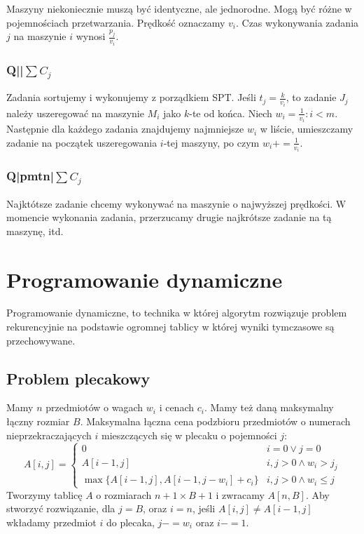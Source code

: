 \documentclass{../notatki}
\begin{document}
Maszyny niekoniecznie muszą być identyczne, ale jednorodne. Mogą być
różne w pojemnościach
przetwarzania. Prędkość oznaczamy $v_i$. Czas wykonywania zadania $j$
na maszynie $i$ wynosi $\frac{p_j}{v_i}$.

\subsubsection{Q||\texorpdfstring{$\sum C_j$}{sum Cj}}

Zadania sortujemy i wykonujemy z porządkiem SPT. Jeśli $t_j = \frac{k}{v_i}$, to
zadanie $J_j$ należy uszeregować na maszynie $M_i$ jako $k$-te od końca.
Niech $w_i = \frac{1}{v_i}: i < m$. Następnie dla każdego zadania
znajdujemy najmniejsze $w_i$ w liście, umieszczamy zadanie na
początek uszeregowania
$i$-tej maszyny, po czym $w_i += \frac{1}{v_i}$.

\subsubsection{Q|pmtn|\texorpdfstring{$\sum C_j$}{sum Cj}}

Najktótsze zadanie chcemy wykonywać na maszynie o najwyższej
prędkości. W momencie
wykonania zadania, przerzucamy drugie najkrótsze zadanie na tą maszynę, itd.

\section{Programowanie dynamiczne}

Programowanie dynamiczne, to technika w której algorytm rozwiązuje problem
rekurencyjnie na podstawie ogromnej tablicy w której wyniki tymczasowe są
przechowywane.

\subsection{Problem plecakowy}

Mamy $n$ przedmiotów o wagach $w_i$ i cenach $c_i$. Mamy też daną maksymalny
łączny rozmiar $B$.
Maksymalna łączna cena podzbioru przedmiotów o numerach nieprzekraczających
$i$ mieszczących się w plecaku o pojemności $j$:
$$
A[i, j] =
\begin{cases}
  0 & i = 0 \lor j = 0 \\
  A[i - 1,j] & i,j > 0 \land w_i > j_j \\
  \max\{A[i - 1,j], A[i - 1,j - w_i] + c_i\} & i,j > 0 \land w_i \leq j
\end{cases}
$$
Tworzymy tablicę $A$ o rozmiarach $n + 1 \times B + 1$ i zwracamy $A[n,B]$.
Aby stworzyć rozwiązanie, dla $j = B$, oraz $i = n$, jeśli $A[i, j]
\neq A[i - 1, j]$ wkładamy
przedmiot $i$ do plecaka, $j -= w_i$ oraz $i -= 1$.
\end{document}
